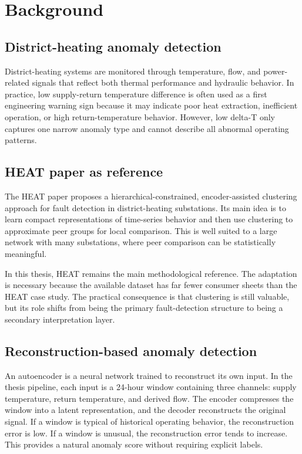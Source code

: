 \section{Background}

\subsection{District-heating anomaly detection}

District-heating systems are monitored through temperature, flow, and power-related signals that reflect both thermal performance and hydraulic behavior. In practice, low supply-return temperature difference is often used as a first engineering warning sign because it may indicate poor heat extraction, inefficient operation, or high return-temperature behavior. However, low delta-T only captures one narrow anomaly type and cannot describe all abnormal operating patterns.

\subsection{HEAT paper as reference}

The HEAT paper proposes a hierarchical-constrained, encoder-assisted clustering approach for fault detection in district-heating substations. Its main idea is to learn compact representations of time-series behavior and then use clustering to approximate peer groups for local comparison. This is well suited to a large network with many substations, where peer comparison can be statistically meaningful.

In this thesis, HEAT remains the main methodological reference. The adaptation is necessary because the available dataset has far fewer consumer sheets than the HEAT case study. The practical consequence is that clustering is still valuable, but its role shifts from being the primary fault-detection structure to being a secondary interpretation layer.

\subsection{Reconstruction-based anomaly detection}

An autoencoder is a neural network trained to reconstruct its own input. In the thesis pipeline, each input is a 24-hour window containing three channels: supply temperature, return temperature, and derived flow. The encoder compresses the window into a latent representation, and the decoder reconstructs the original signal. If a window is typical of historical operating behavior, the reconstruction error is low. If a window is unusual, the reconstruction error tends to increase. This provides a natural anomaly score without requiring explicit labels.

